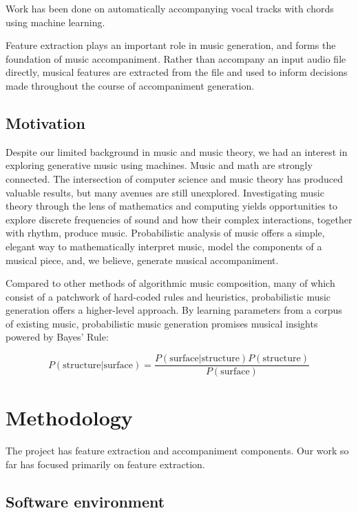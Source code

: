 \documentclass[11pt,conference,letterpaper]{IEEEtran}
\begin{document}
Work has been done on automatically accompanying vocal tracks with chords \cite{simon2008mysong} using machine learning. \cite{morris2008exposing}

Feature extraction plays an important role in music generation, and forms the foundation of music accompaniment. Rather than accompany an input audio file directly, musical features are extracted from the file and used to inform decisions made throughout the course of accompaniment generation.

\subsection{Motivation}

Despite our limited background in music and music theory, we had an interest in exploring generative music using machines. Music and math are strongly connected. The intersection of computer science and music theory has produced valuable results, but many avenues are still unexplored. Investigating music theory through the lens of mathematics and computing yields opportunities to explore discrete frequencies of sound and how their complex interactions, together with rhythm, produce music. Probabilistic analysis of music offers a simple, elegant way to mathematically interpret music, model the components of a musical piece, and, we believe, generate musical accompaniment.

Compared to other methods of algorithmic music composition, many of which consist of a patchwork of hard-coded rules and heuristics, probabilistic music generation offers a higher-level approach. By learning parameters from a corpus of existing music, probabilistic music generation promises musical insights powered by Bayes' Rule:

{\small
  \[ P(\text{structure}|\text{surface}) = \frac{P(\text{surface}|\text{structure})P(\text{structure})}{P(\text{surface})} \]
}


\section{Methodology}

The project has feature extraction and accompaniment components. Our work so far has focused primarily on feature extraction.

\subsection{Software environment}
\end{document}
